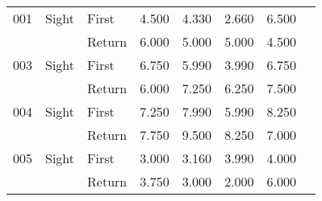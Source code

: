 \begin{table}[!htb]
\begin{tabular}{lllrrrrr}
001 & Sight & First &  4.500 &                                                 4.330 &                                                  2.660 &   6.500 \\
    &       & Return &  6.000 &                                                 5.000 &                                                  5.000 &   4.500 \\
003 & Sight & First &  6.750 &                                                 5.990 &                                                  3.990 &   6.750 \\
    &       & Return &  6.000 &                                                 7.250 &                                                  6.250 &   7.500 \\
004 & Sight & First &  7.250 &                                                 7.990 &                                                  5.990 &   8.250 \\
    &       & Return &  7.750 &                                                 9.500 &                                                  8.250 &   7.000 \\
005 & Sight & First &  3.000 &                                                 3.160 &                                                  3.990 &   4.000 \\
    &       & Return &  3.750 &                                                 3.000 &                                                  2.000 &   6.000 \\
\bottomrule
\end{tabular}
\end{table}

